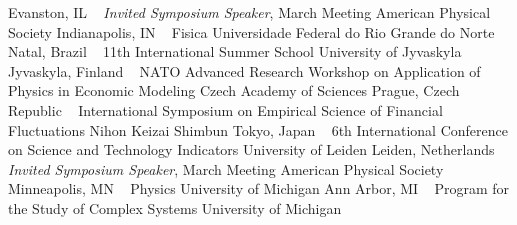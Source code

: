 Evanston, IL
\newline
~
\Gap
{}
\textit{Invited Symposium Speaker}, March Meeting
\newline
    American Physical Society 
    \newline
Indianapolis, IN
\newline
~
\Gap
{}
Fisica
\newline
    Universidade Federal do Rio Grande do Norte
    \newline
Natal, Brazil
\newline
~
\Gap
{}
11th International Summer School
\newline
    University of Jyvaskyla
    \newline
Jyvaskyla, Finland
\newline
~
\Gap
{}
NATO Advanced Research Workshop on Application of Physics in Economic Modeling
\newline
    Czech Academy of Sciences
    \newline
Prague, Czech Republic
\newline
~
\Gap
{}
International Symposium on Empirical Science of Financial Fluctuations 
\newline
    Nihon Keizai Shimbun
    \newline
Tokyo, Japan
\newline
~
\Gap
{}
6th International Conference on Science and Technology Indicators
\newline
    University of Leiden
    \newline
Leiden, Netherlands
\newline
~
\Gap
{}
\textit{Invited Symposium Speaker}, March Meeting
\newline
    American Physical Society 
    \newline
Minneapolis, MN
\newline
~
\Gap
{}
Physics
\newline
    University of Michigan
    \newline
Ann Arbor, MI
\newline
~
\Gap
{}
Program for the Study of Complex Systems
\newline
    University of Michigan
